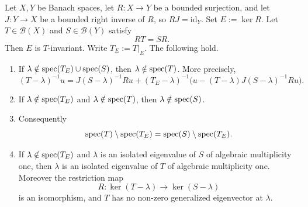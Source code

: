 \begin{lemma}
\label{lem:holder-quotient-spectrum}
Let \(X,Y\) be Banach spaces, let
\(R:X\to Y\) be a bounded surjection, and let
\(J:Y\to X\) be a bounded right inverse of \(R\), so
\(RJ=\mathrm{id}_Y\).
Set \(E:=\ker R\).  Let \(T\in\mathcal B(X)\) and
\(S\in\mathcal B(Y)\) satisfy
\[
  RT=SR .
\]
Then \(E\) is \(T\)-invariant.  Write \(T_E:=T|_E\).  The following hold.
\begin{enumerate}[label=(\roman*)]
  \item If \(\lambda\notin\operatorname{spec}(T_E)\cup\operatorname{spec}(S)\), then
  \(\lambda\notin\operatorname{spec}(T)\).  More precisely,
  \[
    (T-\lambda)^{-1}u
    =
    J(S-\lambda)^{-1}Ru
    +
    (T_E-\lambda)^{-1}
    \bigl(u-(T-\lambda)J(S-\lambda)^{-1}Ru\bigr).
  \]
  \item If \(\lambda\notin\operatorname{spec}(T_E)\) and \(\lambda\notin\operatorname{spec}(T)\),
  then \(\lambda\notin\operatorname{spec}(S)\).
  \item Consequently
  \[
    \operatorname{spec}(T)\setminus\operatorname{spec}(T_E)
    =
    \operatorname{spec}(S)\setminus\operatorname{spec}(T_E).
  \]
  \item If \(\lambda\notin\operatorname{spec}(T_E)\) and \(\lambda\) is an isolated
  eigenvalue of \(S\) of algebraic multiplicity one, then \(\lambda\) is
  an isolated eigenvalue of \(T\) of algebraic multiplicity one.
  Moreover the restriction map
  \[
    R:\ker(T-\lambda)\longrightarrow\ker(S-\lambda)
  \]
  is an isomorphism, and \(T\) has no non-zero generalized eigenvector
  at \(\lambda\).
\end{enumerate}
\end{lemma}

